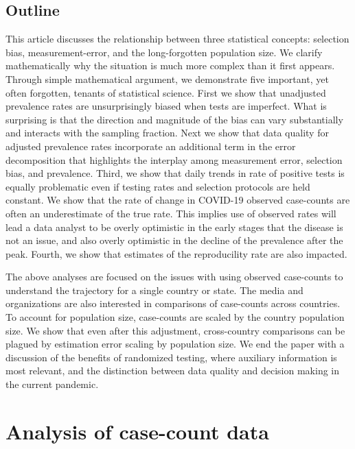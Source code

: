 \documentclass[11pt]{article}
\numberwithin{equation}{section}
\theoremstyle{plain}
\begin{document}
\subsection{Outline}

This article discusses the relationship between three statistical concepts: selection bias, measurement-error, and the long-forgotten population size. We clarify mathematically why the situation is much more complex than it first appears.  Through simple mathematical argument, we demonstrate five important, yet often forgotten, tenants of statistical science.  First we show that unadjusted prevalence rates are unsurprisingly biased when tests are imperfect. What is surprising is that the direction and magnitude of the bias can vary substantially and interacts with the sampling fraction.  Next we show that data quality for adjusted prevalence rates incorporate an additional term in the error decomposition that highlights the interplay among measurement error, selection bias, and prevalence.  Third, we show that daily trends in rate of positive tests is equally problematic even if testing rates and selection protocols are held constant.  We show that the rate of change in COVID-19 observed case-counts are often an underestimate of the true rate. This implies use of observed rates will lead a data analyst to be overly optimistic in the early stages that the disease is not an issue, and also overly optimistic in the decline of the prevalence after the peak.   Fourth, we show that estimates of the reproducility rate are also impacted.

The above analyses are focused on the issues with using observed case-counts to understand the trajectory for a single country or state.  The media and organizations are also interested in comparisons of case-counts across countries. To account for population size, case-counts are scaled by the country population size.  We show that even after this adjustment, cross-country comparisons can be plagued by estimation error scaling by population size.  We end the paper with a discussion of the benefits of randomized testing, where auxiliary information is most relevant, and the distinction between data quality and decision making in the current pandemic.

\section{Analysis of case-count data}
\end{document}
